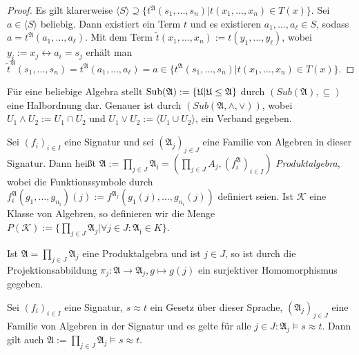 \begin{proof}
    Es gilt klarerweise $\langle S\rangle\supseteq \{t^\mathfrak{A}(s_1,\ldots,s_n)\vert t(x_1,\ldots,x_n)\in T(x)\}$.
    Sei $a\in\langle S\rangle$ beliebig. Dann existiert ein Term $t$ und es existieren $a_1,\ldots,a_\ell\in S$,
    sodass $a=t^\mathfrak{A}(a_1,\ldots,a_\ell)$. Mit dem Term $\tilde{t}(x_1,\ldots,x_n):=t(y_1,\ldots,y_\ell)$, wobei $y_i:=x_j\leftrightarrow a_i=s_j$
    erhält man $\tilde{t}^\mathfrak{A}(s_1,\ldots,s_n)=t^\mathfrak{A}(a_1,\ldots,a_\ell)=a\in\{t^\mathfrak{A}(s_1,\ldots,s_n)\vert t(x_1,\ldots,x_n)\in T(x)\}.$
\end{proof}

\begin{remark}
    Für eine beliebige Algebra stellt $\operatorname{Sub}(\mathfrak{A}):=\{\mathfrak{U}\vert \mathfrak{U}\le \mathfrak{A}\}$ durch
    $(Sub(\mathfrak{A}),\subseteq)$ eine Halbordnung dar. Genauer ist durch $(Sub(\mathfrak{A},\land,\lor))$,
    wobei $U_1\land U_2:=U_1\cap U_2$ und $U_1\lor U_2:=\langle U_1\cup U_2\rangle$, ein Verband gegeben.
\end{remark}

\begin{definition}
    Sei $(f_i)_{i\in I}$ eine Signatur und sei $(\mathfrak{A}_j)_{j\in J}$ eine Familie von Algebren in dieser Signatur.
    Dann heißt $\mathfrak{A}:=\prod_{j\in J}\mathfrak{A_j}=(\prod_{j\in J}A_j,(f^\mathfrak{A}_i)_{i\in I})$ \emph{Produktalgebra},
    wobei die Funktionssymbole durch $f^\mathfrak{A}_i(g_1,\ldots,g_{n_i})(j):=f^{\mathfrak{A}_j}(g_1(j),\ldots,g_{n_i}(j))$
    definiert seien. Ist $\mathcal{K}$ eine Klasse von Algebren, so definieren wir die Menge $P(\mathcal{K}):=\{\prod_{j\in J}\mathfrak{A}_j\vert \forall j\in J:\mathfrak{A_j}\in K\}$.
\end{definition}

\begin{remark}
    Ist $\mathfrak{A}=\prod_{j\in J}\mathfrak{A}_j$ eine Produktalgebra und ist $j\in J$, so ist durch die Projektionsabbildung
    $\pi_j:\mathfrak{A}\to \mathfrak{A}_j, g\mapsto g(j)$ ein surjektiver Homomorphismus gegeben.
\end{remark}

\begin{proposition}
    Sei $(f_i)_{i\in I}$ eine Signatur, $s\approx t$ ein Gesetz über dieser Sprache, $(\mathfrak{A}_j)_{j\in J}$
    eine Familie von Algebren in der Signatur und es gelte für alle $j\in J:\mathfrak{A}_j\models s\approx t$.
    Dann gilt auch $\mathfrak{A}:=\prod_{j\in J}\mathfrak{A}_j\models s\approx t$.
\end{proposition}

